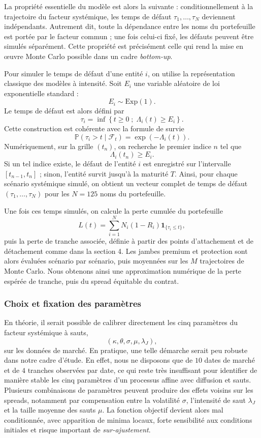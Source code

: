 La propriété essentielle du modèle est alors la suivante : conditionnellement à la trajectoire du facteur systémique, les temps de défaut $\tau_1,\dots,\tau_N$ deviennent indépendants. Autrement dit, toute la dépendance entre les noms du portefeuille est portée par le facteur commun ; une fois celui-ci fixé, les défauts peuvent être simulés séparément. Cette propriété est précisément celle qui rend la mise en œuvre Monte Carlo possible dans un cadre \textit{bottom-up}.

Pour simuler le temps de défaut d'une entité $i$, on utilise la représentation classique des modèles à intensité. Soit $E_i$ une variable aléatoire de loi exponentielle standard :
$$
E_i \sim \mathrm{Exp}(1).
$$
Le temps de défaut est alors défini par
$$
\tau_i=\inf\left\{t\geq 0 \; ; \; \Lambda_i(t)\geq E_i\right\}.
$$
Cette construction est cohérente avec la formule de survie
$$
\mathbb{P}(\tau_i>t \mid \mathcal{F}_t)=\exp\left(-\Lambda_i(t)\right).
$$
Numériquement, sur la grille $(t_n)$, on recherche le premier indice $n$ tel que
$$
\Lambda_i(t_n)\geq E_i.
$$
Si un tel indice existe, le défaut de l'entité $i$ est enregistré sur l'intervalle $[t_{n-1},t_n]$ ; sinon, l'entité survit jusqu'à la maturité $T$. Ainsi, pour chaque scénario systémique simulé, on obtient un vecteur complet de temps de défaut $(\tau_1,\dots,\tau_N)$ pour les $N=125$ noms du portefeuille.

Une fois ces temps simulés, on calcule la perte cumulée du portefeuille
$$
L(t)=\sum_{i=1}^{N} N_i(1-R_i)\mathbf{1}_{\{\tau_i\leq t\}},
$$
puis la perte de tranche associée, définie à partir des points d'attachement et de détachement comme dans la section 4. Les jambes premium et protection sont alors évaluées scénario par scénario, puis moyennées sur les $M$ trajectoires de Monte Carlo. Nous obtenons ainsi une approximation numérique de la perte espérée de tranche, puis du spread équitable du contrat.

\subsubsection{Choix et fixation des paramètres}

En théorie, il serait possible de calibrer directement les cinq paramètres du facteur systémique à sauts,
$$
(\kappa,\theta,\sigma,\mu,\lambda_J),
$$
sur les données de marché. En pratique, une telle démarche serait peu robuste dans notre cadre d'étude. En effet, nous ne disposons que de $10$ dates de marché et de $4$ tranches observées par date, ce qui reste très insuffisant pour identifier de manière stable les cinq paramètres d'un processus affine avec diffusion et sauts. Plusieurs combinaisons de paramètres peuvent produire des effets voisins sur les spreads, notamment par compensation entre la volatilité $\sigma$, l'intensité de saut $\lambda_J$ et la taille moyenne des sauts $\mu$. La fonction objectif devient alors mal conditionnée, avec apparition de minima locaux, forte sensibilité aux conditions initiales et risque important de \textit{sur-ajustement}.

